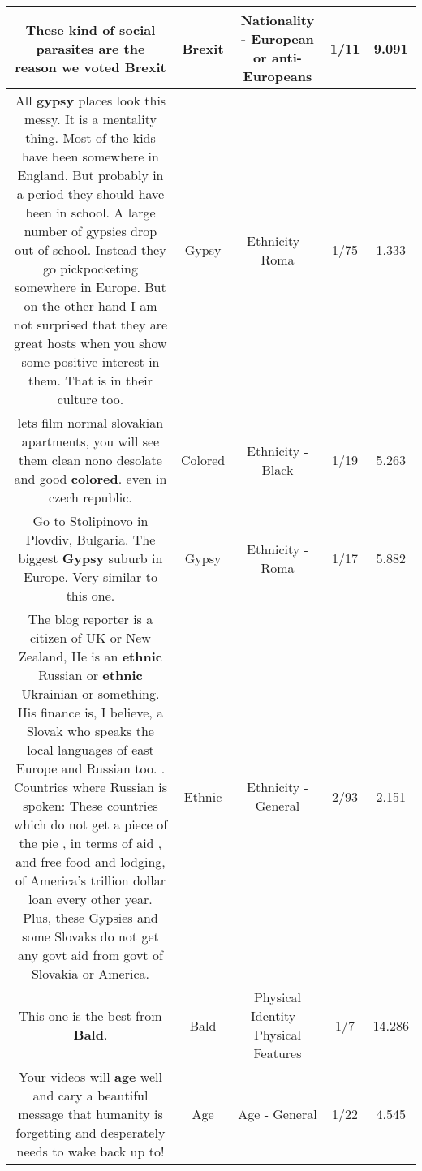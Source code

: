 \documentclass[11pt]{article}
\newlength\mylength
\begin{document}
\begin{center}
\begin{longtable}{|C{.65\mylength}|C{.30\mylength}|C{.12\mylength}|C{.12\mylength}|C{.12\mylength}|}
  \small These kind of social parasites are the reason we voted Brexit\normalsize   & Brexit & Nationality - European or anti-Europeans & 1/11 & 9.091 \\  \hline
  \small All \textbf{gypsy} places look this messy. It is a mentality thing. Most of the kids have been somewhere in England. But probably in a period they should have been in school. A large number of gypsies drop out of school. Instead they go pickpocketing somewhere in Europe. But on the other hand I am not surprised that they are great hosts when you show some positive interest in them. That is in their culture too.\normalsize   & Gypsy & Ethnicity - Roma & 1/75 & 1.333 \\  \hline
  \small lets film normal slovakian apartments, you will see them clean nono desolate and good \textbf{colored}. even in czech republic.\normalsize   & Colored & Ethnicity - Black & 1/19 & 5.263 \\  \hline
  \small Go to Stolipinovo in Plovdiv, Bulgaria. The biggest \textbf{Gypsy} suburb in Europe. Very similar to this one.\normalsize   & Gypsy & Ethnicity - Roma & 1/17 & 5.882 \\  \hline
  \small The blog reporter is a citizen of UK or New Zealand, He is an \textbf{ethnic} Russian or \textbf{ethnic} Ukrainian or something. His finance is, I believe, a Slovak who speaks the local languages of east Europe and Russian too. . Countries where Russian is spoken: These countries which do not get a piece of the pie , in terms of aid , and free food and lodging, of America's trillion dollar loan every other year. Plus, these Gypsies and some Slovaks do not get any govt aid from govt of Slovakia or America.\normalsize   & Ethnic & Ethnicity - General & 2/93 & 2.151 \\  \hline
  \small This one is the best from \textbf{Bald}.\normalsize   & Bald & Physical Identity - Physical Features & 1/7 & 14.286 \\  \hline
  \small Your videos will \textbf{age} well and cary a beautiful message that humanity is forgetting and desperately needs to wake back up to!\normalsize   & Age & Age - General & 1/22 & 4.545 \\  \hline

\end{longtable}
\end{center}
\end{document}
